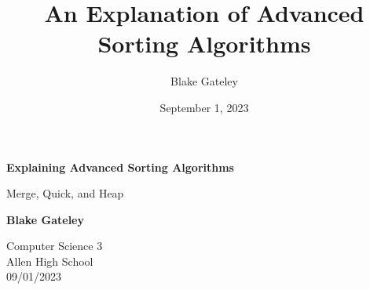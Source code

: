 \documentclass[12pt]{article}
\title{An Explanation of Advanced Sorting Algorithms}
\author{Blake Gateley}
\date{September 1, 2023}
\begin{document}
\begin{titlepage}
   \begin{center}
       \vspace*{1cm}

       {\Huge \textbf{Explaining Advanced Sorting Algorithms}}

       \vspace{0.5cm}
       Merge, Quick, and Heap%
                 
       \vspace{1.5cm}

       \textbf{Blake Gateley}


       
       \vfill
            
       
            
       \vspace{0.8cm}
     
   
            
       Computer Science 3\\
       Allen High School\\
       09/01/2023
            
   \end{center}
\end{titlepage}
\tableofcontents

\newpage
\end{document}

